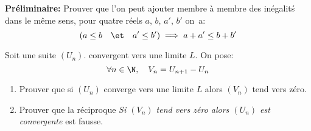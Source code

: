 \begin{exercice}

 {\bf Pr\'eliminaire:} Prouver que l'on peut ajouter membre \`a membre  des in\'egalit\'s dans le m\^eme sens, \ie{} pour quatre r\'eels $a$, $b$, $a'$, $b'$ on~a:
\[(a\leq b \quad \et \quad a'\leq b') \implies a+a'\leq b+b'\]

Soit une suite $(U_n)$. convergent vers une limite $L$. On pose:
\[\forall n\in\N,\quad V_n=U_{n+1}-U_n\]
\begin{enumerate}
\item Prouver que si $(U_n)$ converge vers une limite $L$ alors
  $(V_n)$ tend vers z\'ero.
\item Prouver que la r\'eciproque \og \emph{ Si $(V_n)$ tend vers z\'ero
  alors $(U_n)$ est convergente} \fg{} est fausse.\\
\end{enumerate}
\end{exercice}

